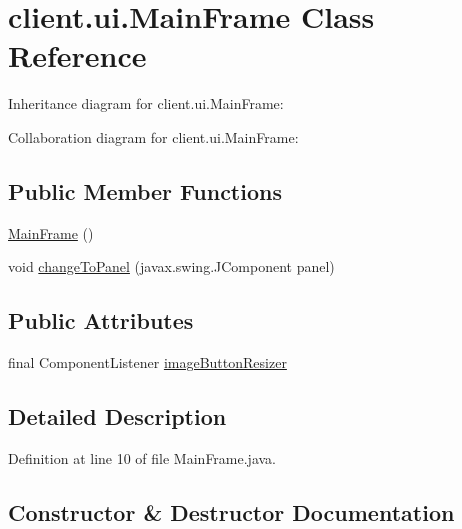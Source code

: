 \hypertarget{classclient_1_1ui_1_1_main_frame}{}\section{client.\+ui.\+Main\+Frame Class Reference}
\label{classclient_1_1ui_1_1_main_frame}


Inheritance diagram for client.\+ui.\+Main\+Frame\+:


Collaboration diagram for client.\+ui.\+Main\+Frame\+:
\subsection*{Public Member Functions}
\begin{DoxyCompactItemize}
\item 
\hyperlink{classclient_1_1ui_1_1_main_frame_ac3662d47eb66c2009f7fc3d0e274a703}{Main\+Frame} ()
\item 
void \hyperlink{classclient_1_1ui_1_1_main_frame_ae415687be6f7197dd0d70d65d08d5221}{change\+To\+Panel} (javax.\+swing.\+J\+Component panel)
\end{DoxyCompactItemize}
\subsection*{Public Attributes}
\begin{DoxyCompactItemize}
\item 
final Component\+Listener \hyperlink{classclient_1_1ui_1_1_main_frame_adc5b4f5b4aa376358a04eddef4741233}{image\+Button\+Resizer}
\end{DoxyCompactItemize}


\subsection{Detailed Description}


Definition at line 10 of file Main\+Frame.\+java.



\subsection{Constructor \& Destructor Documentation}
\hypertarget{classclient_1_1ui_1_1_main_frame_ac3662d47eb66c2009f7fc3d0e274a703}{}\label{classclient_1_1ui_1_1_main_frame_ac3662d47eb66c2009f7fc3d0e274a703} 
